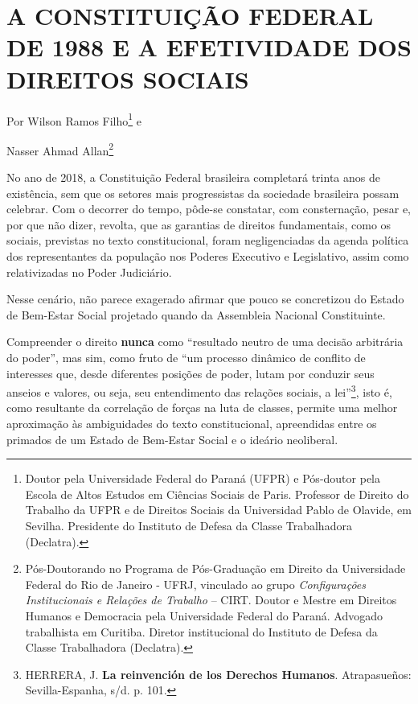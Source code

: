 \section{A CONSTITUIÇÃO FEDERAL DE 1988 E A EFETIVIDADE DOS DIREITOS
SOCIAIS}\label{a-constituiuxe7uxe3o-federal-de-1988-e-a-efetividade-dos-direitos-sociais}

Por Wilson Ramos Filho\footnote{Doutor pela Universidade Federal do
  Paraná (UFPR) e Pós-doutor pela Escola de Altos Estudos em Ciências
  Sociais de Paris. Professor de Direito do Trabalho da UFPR e de
  Direitos Sociais da Universidad Pablo de Olavide, em Sevilha.
  Presidente do Instituto de Defesa da Classe Trabalhadora (Declatra).}
e

Nasser Ahmad Allan\footnote{Pós-Doutorando no Programa de Pós-Graduação
  em Direito da Universidade Federal do Rio de Janeiro - UFRJ, vinculado
  ao grupo \emph{Configurações Institucionais e Relações de Trabalho} --
  CIRT. Doutor e Mestre em Direitos Humanos e Democracia pela
  Universidade Federal do Paraná. Advogado trabalhista em Curitiba.
  Diretor institucional do Instituto de Defesa da Classe Trabalhadora
  (Declatra).}

No ano de 2018, a Constituição Federal brasileira completará trinta anos
de existência, sem que os setores mais progressistas da sociedade
brasileira possam celebrar. Com o decorrer do tempo, pôde-se constatar,
com consternação, pesar e, por que não dizer, revolta, que as garantias
de direitos fundamentais, como os sociais, previstas no texto
constitucional, foram negligenciadas da agenda política dos
representantes da população nos Poderes Executivo e Legislativo, assim
como relativizadas no Poder Judiciário.

Nesse cenário, não parece exagerado afirmar que pouco se concretizou do
Estado de Bem-Estar Social projetado quando da Assembleia Nacional
Constituinte.

Compreender o direito \textbf{nunca} como ``resultado neutro de uma
decisão arbitrária do poder'', mas sim, como fruto de ``um processo
dinâmico de conflito de interesses que, desde diferentes posições de
poder, lutam por conduzir seus anseios e valores, ou seja, seu
entendimento das relações sociais, a lei''\footnote{HERRERA, J.
  \textbf{La reinvención de los Derechos Humanos}. Atrapasueños:
  Sevilla-Espanha, s/d. p. 101.}, isto é, como resultante da correlação
de forças na luta de classes, permite uma melhor aproximação às
ambiguidades do texto constitucional, apreendidas entre os primados de
um Estado de Bem-Estar Social e o ideário neoliberal.

